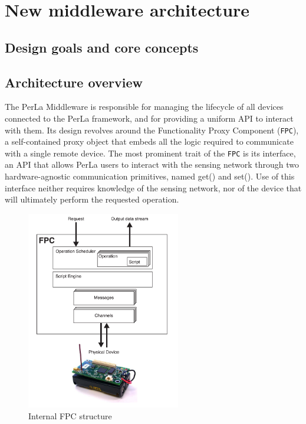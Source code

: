 \chapter{New middleware architecture}

\section{Design goals and core concepts}

\section{Architecture overview}

The PerLa Middleware is responsible for managing the lifecycle of all devices
connected to the PerLa framework, and for providing a uniform API to interact
with them. Its design revolves around the Functionality Proxy Component
(\texttt{FPC}), a self-contained proxy object that embeds all the logic
required to communicate with a single remote device.  The most prominent trait
of the \texttt{FPC} is its interface, an API that allows PerLa users to
interact with the sensing network through two hardware-agnostic communication
primitives, named get() and set().  Use of this interface neither requires
knowledge of the sensing network, nor of the device that will ultimately
perform the requested operation.

\begin{figure}[h!]
\center
\includegraphics[width=0.6\textwidth]{imgs/fpc.pdf}
\caption{Internal FPC structure}
\label{fig:fpc_overview}
\end{figure}

